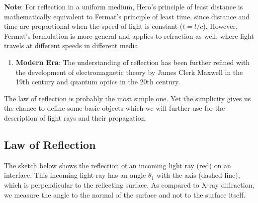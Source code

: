 \documentclass[
  a4paper,
]{book}
\providecommand{\tightlist}{%
  \setlength{\itemsep}{0pt}\setlength{\parskip}{0pt}}
\begin{document}
\begin{tcolorbox}
\textbf{Note}: For reflection in a uniform medium, Hero's principle of
least distance is mathematically equivalent to Fermat's principle of
least time, since distance and time are proportional when the speed of
light is constant (\(t = l/c\)). However, Fermat's formulation is more
general and applies to refraction as well, where light travels at
different speeds in different media.

\begin{enumerate}
\def\labelenumi{\arabic{enumi}.}
\setcounter{enumi}{4}
\tightlist
\item
  \textbf{Modern Era}: The understanding of reflection has been further
  refined with the development of electromagnetic theory by James Clerk
  Maxwell in the 19th century and quantum optics in the 20th century.
\end{enumerate}

\end{tcolorbox}

The law of reflection is probably the most simple one. Yet the
simplicity gives us the chance to define some basic objects which we
will further use for the description of light rays and their
propagation.

\subsection{Law of Reflection}\label{sec-law-of-reflection}

The sketch below shows the reflection of an incoming light ray (red) on
an interface. This incoming light ray has an angle \(\theta_{1}\) with
the axis (dashed line), which is perpendicular to the reflecting
surface. As compared to X-ray diffraction, we measure the angle to the
normal of the surface and not to the surface itself.
\end{document}

